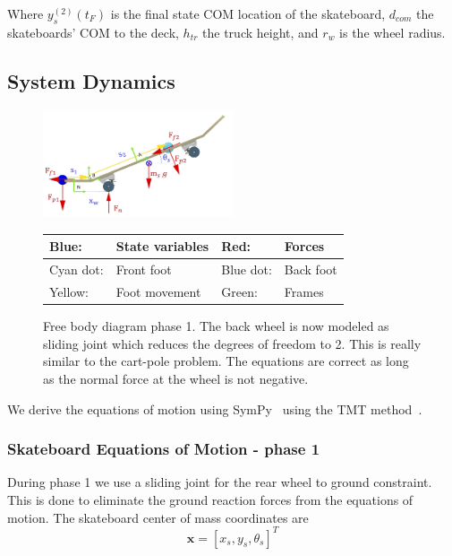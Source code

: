 \documentclass[default,iicol]{sn-jnl}
\begin{document}
\noindent Where $y_s^{(2)}(t_F)$ is the final state COM location of the
skateboard, $d_{com}$ the skateboards' COM to the deck, $h_{tr}$ the truck
height, and $r_w$ is the wheel radius.

\subsection{System Dynamics}\label{s_systemdynamics}
\begin{figure}
    \centering
    \includegraphics[width = 0.5\textwidth]{figure/FBD_phase1.png}
    \footnotesize\begin{tabular}{|l l|l l|} \hline
    \color{blue}Blue: & State variables &\color{red} Red: & Forces \\ \hline
    \color{cyan}Cyan dot: & Front foot & \color{blue}Blue dot: & Back foot \\ \hline
    \color{yellow}Yellow: & Foot movement & \color{green}Green: & Frames \\ \hline
    \end{tabular}
    \caption[Free body diagram phase 1]{Free body diagram phase 1. The back wheel is now modeled as sliding joint which reduces the degrees of freedom to 2. This is really  similar to the cart-pole problem. The equations are correct as long as the normal force at the wheel is not negative.}
    \label{f_FBDphas1}
\end{figure}

We derive the equations of motion using SymPy~\cite{meurer_sympy_2017} using
the TMT method~\cite{vallery_heike_advanced_2018}.

\subsubsection{Skateboard Equations of Motion - phase 1}
During phase 1 we use a sliding joint for the rear wheel to ground constraint.
This is done to eliminate the ground reaction forces from the equations of
motion.
The skateboard center of mass coordinates are
%
\begin{equation}
    \mathbf{x} = [x_s, y_s, \theta_s]^T
\end{equation}
\end{document}
